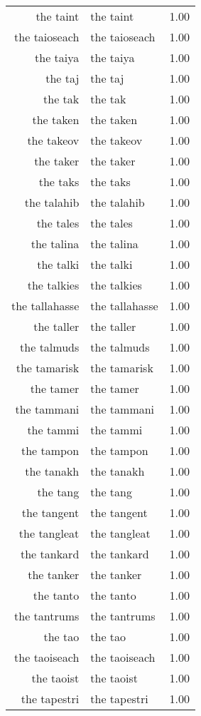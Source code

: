 \begin{table}[ht]
\begin{tabular}{rlr}
  the taint & the taint & 1.00 \\ 
  the taioseach & the taioseach & 1.00 \\ 
  the taiya & the taiya & 1.00 \\ 
  the taj & the taj & 1.00 \\ 
  the tak & the tak & 1.00 \\ 
  the taken & the taken & 1.00 \\ 
  the takeov & the takeov & 1.00 \\ 
  the taker & the taker & 1.00 \\ 
  the taks & the taks & 1.00 \\ 
  the talahib & the talahib & 1.00 \\ 
  the tales & the tales & 1.00 \\ 
  the talina & the talina & 1.00 \\ 
  the talki & the talki & 1.00 \\ 
  the talkies & the talkies & 1.00 \\ 
  the tallahasse & the tallahasse & 1.00 \\ 
  the taller & the taller & 1.00 \\ 
  the talmuds & the talmuds & 1.00 \\ 
  the tamarisk & the tamarisk & 1.00 \\ 
  the tamer & the tamer & 1.00 \\ 
  the tammani & the tammani & 1.00 \\ 
  the tammi & the tammi & 1.00 \\ 
  the tampon & the tampon & 1.00 \\ 
  the tanakh & the tanakh & 1.00 \\ 
  the tang & the tang & 1.00 \\ 
  the tangent & the tangent & 1.00 \\ 
  the tangleat & the tangleat & 1.00 \\ 
  the tankard & the tankard & 1.00 \\ 
  the tanker & the tanker & 1.00 \\ 
  the tanto & the tanto & 1.00 \\ 
  the tantrums & the tantrums & 1.00 \\ 
  the tao & the tao & 1.00 \\ 
  the taoiseach & the taoiseach & 1.00 \\ 
  the taoist & the taoist & 1.00 \\ 
  the tapestri & the tapestri & 1.00 \\ 

\end{tabular}
\end{table}
